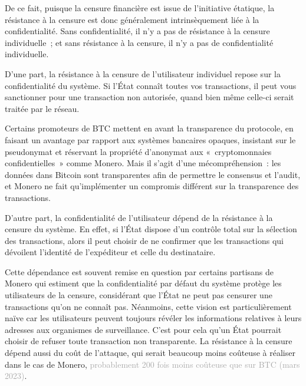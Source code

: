 
De ce fait, puisque la censure financière est issue de l'initiative étatique, la résistance à la censure est donc généralement intrinsèquement liée à la confidentialité. Sans confidentialité, il n'y a pas de résistance à la censure individuelle~; et sans résistance à la censure, il n'y a pas de confidentialité individuelle.

D'une part, la résistance à la censure de l'utilisateur individuel repose sur la confidentialité du système. Si l'État connaît toutes vos transactions, il peut vous sanctionner pour une transaction non autorisée, quand bien même celle-ci serait traitée par le réseau.

Certains promoteurs de BTC mettent en avant la transparence du protocole, en faisant un avantage par rapport aux systèmes bancaires opaques, insistant sur le pseudonymat et réservant la propriété d'anonymat aux «~cryptomonnaies confidentielles~» comme Monero. Mais il s'agit d'une mécompréhension~: les données dans Bitcoin sont transparentes afin de permettre le consensus et l'audit, et Monero ne fait qu'implémenter un compromis différent sur la transparence des transactions.

D'autre part, la confidentialité de l'utilisateur dépend de la résistance à la censure du système. En effet, si l'État dispose d'un contrôle total sur la sélection des transactions, alors il peut choisir de ne confirmer que les transactions qui dévoilent l'identité de l'expéditeur et celle du destinataire.

Cette dépendance est souvent remise en question par certains partisans de Monero qui estiment que la confidentialité par défaut du système protège les utilisateurs de la censure, considérant que l'État ne peut pas censurer une transactions qu'on ne connaît pas. Néanmoins, cette vision est particulièrement naïve car les utilisateurs peuvent toujours révéler les informations relatives à leurs adresses aux organismes de surveillance. C'est pour cela qu'un État pourrait choisir de refuser toute transaction non transparente. La résistance à la censure dépend aussi du coût de l'attaque, qui serait beaucoup moins coûteuse à réaliser dans le cas de Monero, \textcolor{darkgray}{probablement 200 fois moins coûteuse que sur BTC (mars 2023)}.

